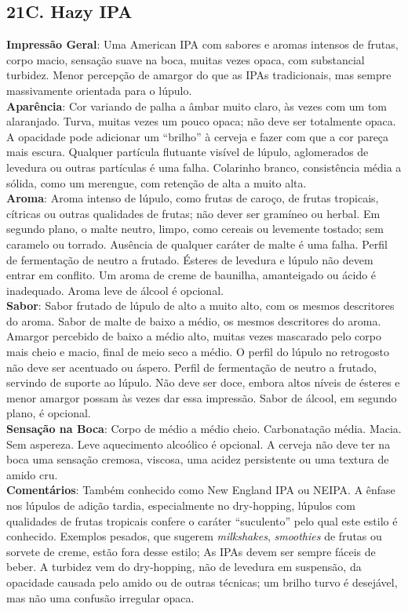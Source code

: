 \subsection*{21C. Hazy IPA}
\textbf{Impressão Geral}: Uma American IPA com sabores e aromas intensos de frutas, corpo macio, sensação suave na boca, muitas vezes opaca, com substancial turbidez. Menor percepção de amargor do que as IPAs tradicionais, mas sempre massivamente orientada para o lúpulo. \\
\textbf{Aparência}: Cor variando de palha a âmbar muito claro, às vezes com um tom alaranjado. Turva, muitas vezes um pouco opaca; não deve ser totalmente opaca. A opacidade pode adicionar um “brilho” à cerveja e fazer com que a cor pareça mais escura. Qualquer partícula flutuante visível de lúpulo, aglomerados de levedura ou outras partículas é uma falha. Colarinho branco, consistência média a sólida, como um merengue, com retenção de alta a muito alta. \\
\textbf{Aroma}: Aroma intenso de lúpulo, como frutas de caroço, de frutas tropicais, cítricas ou outras qualidades de frutas; não dever ser gramíneo ou herbal. Em segundo plano, o malte neutro, limpo, como cereais ou levemente tostado; sem caramelo ou torrado. Ausência de qualquer caráter de malte é uma falha. Perfil de fermentação de neutro a frutado. Ésteres de levedura e lúpulo não devem entrar em conflito. Um aroma de creme de baunilha, amanteigado ou ácido é inadequado. Aroma leve de álcool é opcional. \\
\textbf{Sabor}: Sabor frutado de lúpulo de alto a muito alto, com os mesmos descritores do aroma. Sabor de malte de baixo a médio, os mesmos descritores do aroma. Amargor percebido de baixo a médio alto, muitas vezes mascarado pelo corpo mais cheio e macio, final de meio seco a médio. O perfil do lúpulo no retrogosto não deve ser acentuado ou áspero. Perfil de fermentação de neutro a frutado, servindo de suporte ao lúpulo. Não deve ser doce, embora altos níveis de ésteres e menor amargor possam às vezes dar essa impressão. Sabor de álcool, em segundo plano, é opcional. \\
\textbf{Sensação na Boca}: Corpo de médio a médio cheio. Carbonatação média. Macia. Sem aspereza. Leve aquecimento alcoólico é opcional. A cerveja não deve ter na boca uma sensação cremosa, viscosa, uma acidez persistente ou uma textura de amido cru. \\
\textbf{Comentários}: Também conhecido como New England IPA ou NEIPA. A ênfase nos lúpulos de adição tardia, especialmente no dry-hopping, lúpulos com qualidades de frutas tropicais confere o caráter “suculento” pelo qual este estilo é conhecido. Exemplos pesados, que sugerem \textit{milkshakes}, \textit{smoothies} de frutas ou sorvete de creme, estão fora desse estilo; As IPAs devem ser sempre fáceis de beber. A turbidez vem do dry-hopping, não de levedura em suspensão, da opacidade causada pelo amido ou de outras técnicas; um brilho turvo é desejável, mas não uma confusão irregular opaca. \\
